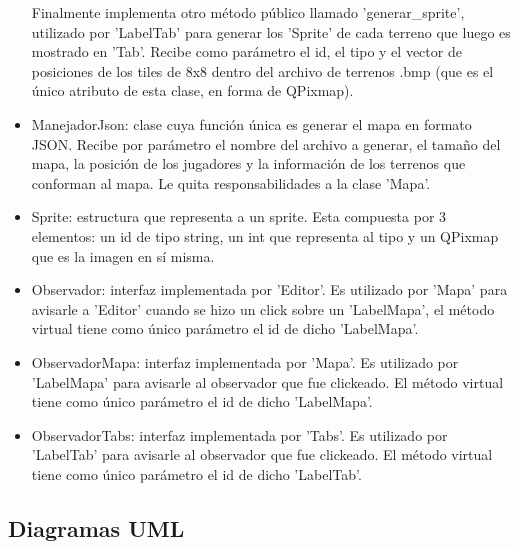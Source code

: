 \documentclass[titlepage,a4paper,12pt]{article}
\begin{document}
\begin{itemize}
Finalmente implementa otro método público llamado 'generar\_sprite', utilizado por 'LabelTab' para generar los 'Sprite' de cada terreno que luego es mostrado en 'Tab'. Recibe como parámetro el id, el tipo y el vector de posiciones de los tiles de 8x8 dentro del archivo de terrenos .bmp (que es el único atributo de esta clase, en forma de QPixmap).

\item ManejadorJson: clase cuya función única es generar el mapa en formato JSON. Recibe por parámetro el nombre del archivo a generar, el tamaño del mapa, la posición de los jugadores y la información de los terrenos que conforman al mapa. Le quita responsabilidades a la clase 'Mapa'.

\item Sprite: estructura que representa a un sprite. Esta compuesta por 3 elementos: un id de tipo string, un int que representa al tipo y un QPixmap que es la imagen en sí misma.

\item Observador: interfaz implementada por 'Editor'. Es utilizado por 'Mapa' para avisarle a 'Editor' cuando se hizo un click sobre un 'LabelMapa', el método virtual tiene como único parámetro el id de dicho 'LabelMapa'.

\item ObservadorMapa: interfaz implementada por 'Mapa'. Es utilizado por 'LabelMapa' para avisarle al observador que fue clickeado. El método virtual tiene como único parámetro el id de dicho 'LabelMapa'. 

\item ObservadorTabs: interfaz implementada por 'Tabs'. Es utilizado por 'LabelTab' para avisarle al observador que fue clickeado. El método virtual tiene como único parámetro el id de dicho 'LabelTab'. 

\end{itemize}

\subsection{Diagramas UML}
\end{document}
